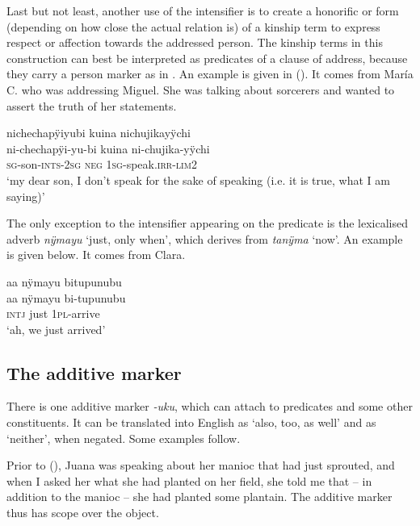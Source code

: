 Last but not least, another use of the intensifier is to create a honorific or  form (depending on how close the actual relation is) of a kinship term to express respect or affection towards the addressed person. The kinship terms in this construction can best be interpreted as predicates of a clause of address, because they carry a person marker as in . An example is given in (). It comes from María C. who was addressing Miguel. She was talking about sorcerers and wanted to assert the truth of her statements.

\ea\label{ex:yu-HON}
\begingl
\glpreamble nichechapÿiyubi kuina nichujikayÿchi\\
\gla ni-chechapÿi-yu-bi kuina ni-chujika-yÿchi\\
\textsc{sg}-son-\textsc{ints}-2\textsc{sg} \textsc{neg} 1\textsc{sg}-speak.\textsc{irr}-\textsc{lim}2\\
\glft ‘my dear son, I don’t speak for the sake of speaking (i.e. it is true, what I am saying)’
\endgl
\trailingcitation{[ump-p110815sf.500]}
\xe

The only exception to the intensifier appearing on the predicate is the lexicalised adverb \textit{nÿmayu} ‘just, only when’, which derives from \textit{tanÿma} ‘now’. An example is given below. It comes from Clara.

\ea
\begingl
\glpreamble aa nÿmayu bitupunubu\\
\gla aa nÿmayu bi-tupunubu\\
\glb \textsc{intj} just 1\textsc{pl}-arrive\\
\glft ‘ah, we just arrived’
\endgl
\trailingcitation{[cux-c120510l-1.278]}
\xe
{}

\subsection{The additive marker}\label{sec:Additive}

There is one additive marker \textit{-uku}, which can attach to predicates and some other constituents. It can be translated into English as ‘also, too, as well’ and as ‘neither’, when negated. Some examples follow.

Prior to (), Juana  was speaking about her manioc that had just sprouted, and when I asked her what she had planted on her field, she told me that – in addition to the manioc – she had planted some plantain. The additive marker thus has scope over the object.

